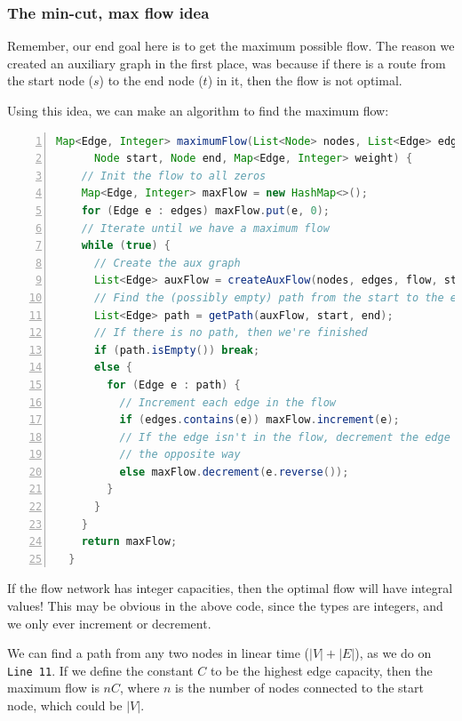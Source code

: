 
\subsubsection{The min-cut, max flow idea}

Remember, our end goal here is to get the maximum possible flow. The reason we
created an auxiliary graph in the first place, was because if there is a route
from the start node ($s$) to the end node ($t$) in it, then the flow is not
optimal.

Using this idea, we can make an algorithm to find the maximum flow:


\begin{lstlisting}[numbers=left,language=Java]
  Map<Edge, Integer> maximumFlow(List<Node> nodes, List<Edge> edges,
      Node start, Node end, Map<Edge, Integer> weight) {
    // Init the flow to all zeros
    Map<Edge, Integer> maxFlow = new HashMap<>();
    for (Edge e : edges) maxFlow.put(e, 0);
    // Iterate until we have a maximum flow
    while (true) {
      // Create the aux graph
      List<Edge> auxFlow = createAuxFlow(nodes, edges, flow, start, end);
      // Find the (possibly empty) path from the start to the end
      List<Edge> path = getPath(auxFlow, start, end);
      // If there is no path, then we're finished
      if (path.isEmpty()) break;
      else {
        for (Edge e : path) {
          // Increment each edge in the flow
          if (edges.contains(e)) maxFlow.increment(e);
          // If the edge isn't in the flow, decrement the edge going
          // the opposite way
          else maxFlow.decrement(e.reverse());
        }
      }
    }
    return maxFlow;
  }
\end{lstlisting}

If the flow network has integer capacities, then the optimal flow will have
integral values! This may be obvious in the above code, since the types are
integers, and we only ever increment or decrement.

We can find a path from any two nodes in linear time ($|V| + |E|$), as we do on
\texttt{Line 11}. If we define the constant $C$ to be the highest edge capacity,
then the maximum flow is $nC$, where $n$ is the number of nodes connected to the
start node, which could be $|V|$.

